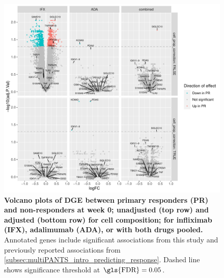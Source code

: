 \begin{figure}
    \centering
    \includegraphics[width=1.0\textwidth,page=1]{mainmatter/figures/chapter_04/plot_gene_set_enrichment.dge_result_volcano_simple_C_1RI_1NI,C_1RA_1NA,C_1R_1N.pdf}
    \caption{
        \textbf{Volcano plots of \gls{DGE} between primary responders (PR) and non-responders at week 0; unadjusted (top row) and adjusted (bottom row) for cell composition; for infliximab (IFX), adalimumab (ADA), or with both drugs pooled.}
        Annotated genes include significant associations from this study and previously reported associations from \autoref{subsec:multiPANTS_intro_predicting_response}.
        Dashed line shows significance threshold at $\text{\gls{FDR}} = 0.05$.
    }
    \label{fig:multipants_dge_volcano_week_0_R_N}
\end{figure}


